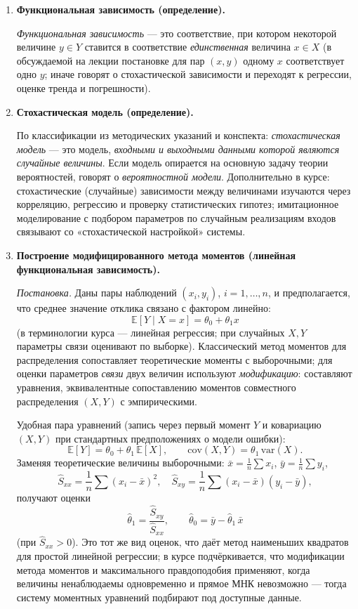 \documentclass[12pt,a4paper]{article}
\begin{document}
\begin{enumerate}[label=\textbf{\arabic*.}]
\item \textbf{Функциональная зависимость (определение).}

\emph{Функциональная зависимость} — это соответствие, при котором некоторой величине $y\in Y$ ставится в соответствие \emph{единственная} величина $x\in X$ (в обсуждаемой на лекции постановке для пар $(x,y)$ одному $x$ соответствует одно $y$; иначе говорят о стохастической зависимости и переходят к регрессии, оценке тренда и погрешности).

\item \textbf{Стохастическая модель (определение).}

По классификации из методических указаний и конспекта: \emph{стохастическая модель} — это модель, \emph{входными и выходными данными которой являются случайные величины}. Если модель опирается на основную задачу теории вероятностей, говорят о \emph{вероятностной модели}. Дополнительно в курсе: стохастические (случайные) зависимости между величинами изучаются через корреляцию, регрессию и проверку статистических гипотез; имитационное моделирование с подбором параметров по случайным реализациям входов связывают со «стохастической настройкой» системы.

\item \textbf{Построение модифицированного метода моментов (линейная функциональная зависимость).}

\emph{Постановка.} Даны пары наблюдений $(x_i,y_i)$, $i=1,\ldots,n$, и предполагается, что среднее значение отклика связано с фактором линейно:
\[
\mathbb{E}[Y\mid X=x] = \theta_0 + \theta_1 x
\]
(в терминологии курса — линейная регрессия; при случайных $X,Y$ параметры связи оценивают по выборке). Классический метод моментов для распределения сопоставляет теоретические моменты с выборочными; для оценки параметров \emph{связи} двух величин используют \emph{модификацию}: составляют уравнения, эквивалентные сопоставлению моментов совместного распределения $(X,Y)$ с эмпирическими.

Удобная пара уравнений (запись через первый момент $Y$ и ковариацию $(X,Y)$ при стандартных предположениях о модели ошибки):
\[
\mathbb{E}[Y] = \theta_0 + \theta_1\,\mathbb{E}[X], \qquad
\mathrm{cov}(X,Y) = \theta_1\,\mathrm{var}(X).
\]
Заменяя теоретические величины выборочными: $\bar{x}=\frac1n\sum x_i$, $\bar{y}=\frac1n\sum y_i$,
\[
\widehat{S}_{xx}=\frac1n\sum(x_i-\bar{x})^2,\quad
\widehat{S}_{xy}=\frac1n\sum(x_i-\bar{x})(y_i-\bar{y}),
\]
получают оценки
\[
\hat\theta_1 = \frac{\widehat{S}_{xy}}{\widehat{S}_{xx}}, \qquad
\hat\theta_0 = \bar{y} - \hat\theta_1\,\bar{x}
\]
(при $\widehat{S}_{xx}>0$). Это тот же вид оценок, что даёт метод наименьших квадратов для простой линейной регрессии; в курсе подчёркивается, что модификации метода моментов и максимального правдоподобия применяют, когда величины ненаблюдаемы одновременно и прямое МНК невозможно — тогда систему моментных уравнений подбирают под доступные данные.


\end{enumerate}
\end{document}
